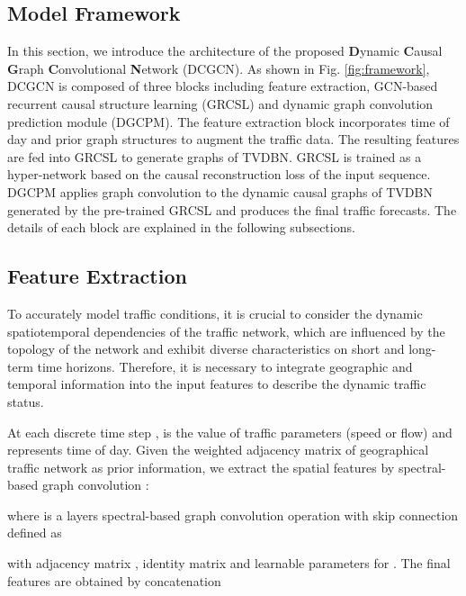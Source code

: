 \documentclass[letterpaper, 10 pt, conference]{ieeeconf}
\newcommand{\revise}[1]{{\color{black}{#1}}}
\begin{document}
\subsection{Model Framework}
In this section, we introduce the architecture of the proposed \textbf{D}ynamic \textbf{C}ausal \textbf{G}raph \textbf{C}onvolutional \textbf{N}etwork (DCGCN). As shown in Fig. \ref{fig:framework}, DCGCN is composed of three blocks including feature extraction, GCN-based recurrent causal structure learning (GRCSL) and dynamic graph convolution prediction module (DGCPM). The feature extraction block incorporates time of day and prior graph structures to augment the traffic data. The resulting features are fed into GRCSL to generate graphs of TVDBN. GRCSL is trained as a hyper-network based on the causal reconstruction loss of the input sequence. DGCPM applies graph convolution to the dynamic causal graphs of TVDBN generated by the pre-trained GRCSL and produces the final traffic forecasts. The details of each block are explained in the following subsections.

\subsection{Feature Extraction}

To accurately model traffic conditions, it is crucial to consider the dynamic spatiotemporal dependencies of the traffic network, which are influenced by the topology of the network and exhibit diverse characteristics on short and long-term time horizons. Therefore, it is necessary to integrate geographic and temporal information into the input features to describe the dynamic traffic status.


At each discrete time step ,  is the value of traffic parameters (speed or flow) and  represents time of day. Given the weighted adjacency matrix  of geographical traffic network as prior information, we extract the spatial features by spectral-based graph convolution \cite{kipf2016semi}:

where  is a  layers spectral-based graph convolution operation with skip connection defined as
\vspace{-2pt}

with adjacency matrix , identity matrix  and learnable parameters  for . The final features are obtained by concatenation

\revise{where concatenation operator  represents joining two matrices or tensors along the last dimension.} 
\end{document}
